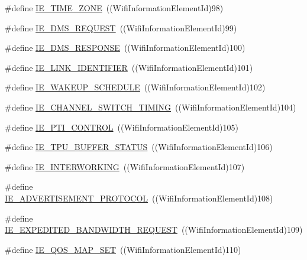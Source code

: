 \begin{DoxyCompactItemize}
\item 
\#define \hyperlink{wifi-information-element_8h_a248ada41e8e783213ea0691b4c95c606}{I\+E\+\_\+\+T\+I\+M\+E\+\_\+\+Z\+O\+NE}~((Wifi\+Information\+Element\+Id)98)
\item 
\#define \hyperlink{wifi-information-element_8h_afd6407ff6d5f4a6be2741e355419004e}{I\+E\+\_\+\+D\+M\+S\+\_\+\+R\+E\+Q\+U\+E\+ST}~((Wifi\+Information\+Element\+Id)99)
\item 
\#define \hyperlink{wifi-information-element_8h_a07933559324bf02e207e489241318302}{I\+E\+\_\+\+D\+M\+S\+\_\+\+R\+E\+S\+P\+O\+N\+SE}~((Wifi\+Information\+Element\+Id)100)
\item 
\#define \hyperlink{wifi-information-element_8h_a71f3f42feaab4218c242b600da7e4b16}{I\+E\+\_\+\+L\+I\+N\+K\+\_\+\+I\+D\+E\+N\+T\+I\+F\+I\+ER}~((Wifi\+Information\+Element\+Id)101)
\item 
\#define \hyperlink{wifi-information-element_8h_a6a54a12f80e184c7444707df3166498a}{I\+E\+\_\+\+W\+A\+K\+E\+U\+P\+\_\+\+S\+C\+H\+E\+D\+U\+LE}~((Wifi\+Information\+Element\+Id)102)
\item 
\#define \hyperlink{wifi-information-element_8h_aa7e41e3ca9a9e81b53e67b2f7ac697a5}{I\+E\+\_\+\+C\+H\+A\+N\+N\+E\+L\+\_\+\+S\+W\+I\+T\+C\+H\+\_\+\+T\+I\+M\+I\+NG}~((Wifi\+Information\+Element\+Id)104)
\item 
\#define \hyperlink{wifi-information-element_8h_a396d829b5c23202abf8ecc881e5d69be}{I\+E\+\_\+\+P\+T\+I\+\_\+\+C\+O\+N\+T\+R\+OL}~((Wifi\+Information\+Element\+Id)105)
\item 
\#define \hyperlink{wifi-information-element_8h_ac75e1cdd1967324bced88407b2c007fb}{I\+E\+\_\+\+T\+P\+U\+\_\+\+B\+U\+F\+F\+E\+R\+\_\+\+S\+T\+A\+T\+US}~((Wifi\+Information\+Element\+Id)106)
\item 
\#define \hyperlink{wifi-information-element_8h_a866f1dcc028bec1fce9090f3456464cf}{I\+E\+\_\+\+I\+N\+T\+E\+R\+W\+O\+R\+K\+I\+NG}~((Wifi\+Information\+Element\+Id)107)
\item 
\#define \hyperlink{wifi-information-element_8h_a52ed55aca8504dca251905e6ed96509c}{I\+E\+\_\+\+A\+D\+V\+E\+R\+T\+I\+S\+E\+M\+E\+N\+T\+\_\+\+P\+R\+O\+T\+O\+C\+OL}~((Wifi\+Information\+Element\+Id)108)
\item 
\#define \hyperlink{wifi-information-element_8h_a2daa4f2d5131d6b899f0f474e6c571d2}{I\+E\+\_\+\+E\+X\+P\+E\+D\+I\+T\+E\+D\+\_\+\+B\+A\+N\+D\+W\+I\+D\+T\+H\+\_\+\+R\+E\+Q\+U\+E\+ST}~((Wifi\+Information\+Element\+Id)109)
\item 
\#define \hyperlink{wifi-information-element_8h_a5a919365db070fd5c16802d93119a802}{I\+E\+\_\+\+Q\+O\+S\+\_\+\+M\+A\+P\+\_\+\+S\+ET}~((Wifi\+Information\+Element\+Id)110)

\end{DoxyCompactItemize}
